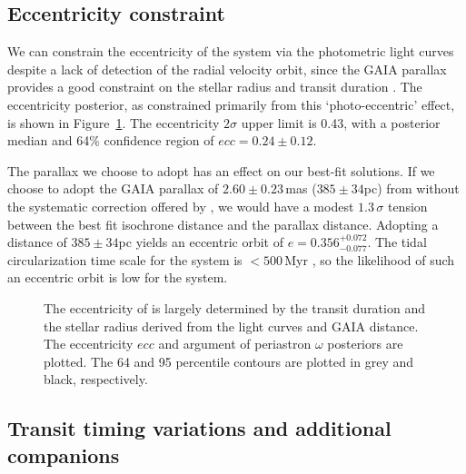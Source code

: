 \documentclass[apjl]{emulateapj}
\begin{document}
\subsection{Eccentricity constraint}
\label{sec:ecc_constraint}

We can constrain the eccentricity of the system via the photometric light curves despite a lack of detection of the radial velocity orbit, since the GAIA parallax provides a good constraint on the stellar radius and transit duration \citep{2008MNRAS.389.1383K,2012ApJ...756..122D}. The eccentricity posterior, as constrained primarily from this `photo-eccentric' effect, is shown in Figure~\ref{fig:eccposterior}. The eccentricity $2\sigma$ upper limit is 0.43, with a posterior median and 64\% confidence region of $ecc = 0.24\pm0.12$.

The parallax we choose to adopt has an effect on our best-fit solutions. If we choose to adopt the GAIA parallax of $2.60 \pm 0.23$\,mas ($385 \pm 34$pc) from \citet{2016arXiv160904303L} without the systematic correction offered by \citet{2016ApJ...831L...6S}, we would have a modest $1.3\,\sigma$ tension between the best fit isochrone distance and the parallax distance. Adopting a distance of $385\pm34$pc yields an eccentric orbit of $e = 0.356_{-0.077}^{+0.072}$. The tidal circularization time scale for the system is $<500$\,Myr \citep{2004ApJ...610..464D}, so the likelihood of such an eccentric orbit is low for the system. 


\begin{figure}[!ht]
\caption{
The eccentricity of \hatcurb{} is largely determined by the transit duration and the stellar radius derived from the light curves and GAIA distance. The eccentricity $ecc$ and argument of periastron $\omega$ posteriors are plotted. The 64 and 95 percentile contours are plotted in grey and black, respectively. 
\label{fig:eccposterior}}
\end{figure}


\subsection{Transit timing variations and additional companions}
\label{sec:ttv}
\end{document}
